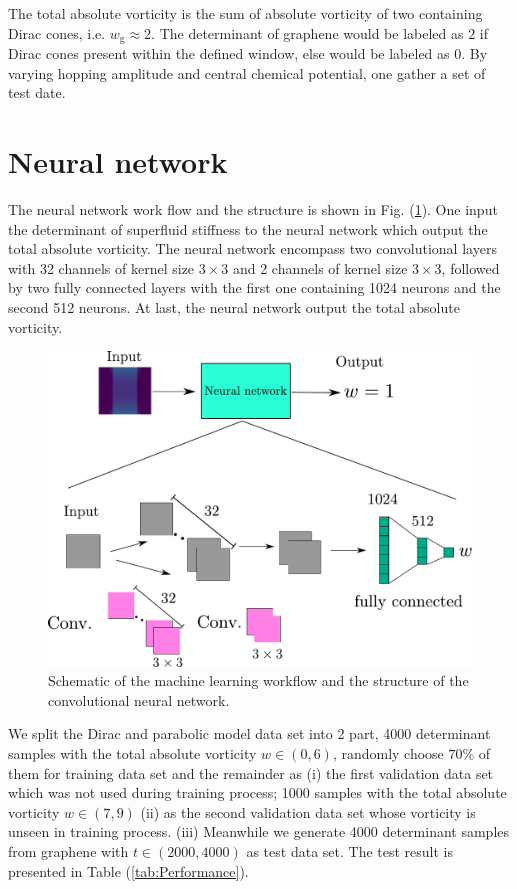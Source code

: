 \documentclass{article}
\begin{document}
The total absolute vorticity is the sum of absolute vorticity of two containing Dirac cones, i.e. $ w_{\textrm{g}} \approx 2  $. The determinant of graphene would be labeled as $ 2 $ if Dirac cones present within the defined window, else would be labeled as $ 0 $. By varying hopping amplitude and central chemical potential, one gather a set of test date.

\section{Neural network}
The neural network work flow and the structure is shown in Fig. (\ref{fig: Neural network}). One input the determinant of superfluid stiffness to the neural network which output the total absolute vorticity. The neural network encompass two convolutional layers with 32 channels of kernel size $ 3 \times 3 $ and 2 channels of kernel size $ 3 \times 3 $, followed by two fully connected layers with the first one containing 1024 neurons and the second 512 neurons. At last, the neural network output the total absolute vorticity. 
\begin{figure}[H]
    \centering
    \includegraphics[width=1\textwidth]{Neural network.pdf}
    \caption{Schematic of the machine learning workflow and the structure of the convolutional neural network.}
    \label{fig: Neural network}
\end{figure}

We split the Dirac and parabolic model data set into 2 part, 4000 determinant samples with the total absolute vorticity $ w \in \left(0,6\right) $, randomly choose $ 70\% $ of them for training data set and the remainder as (i) the first validation data set which was not used during training process; 1000 samples with the total absolute vorticity $ w \in \left(7,9\right) $ (ii) as the second validation data set whose vorticity is unseen in training process. (iii) Meanwhile we generate 4000 determinant samples from graphene with $ t \in \left(2000,4000\right) $ as test data set. The test result is presented in Table (\ref{tab:Performance}).
\end{document}
